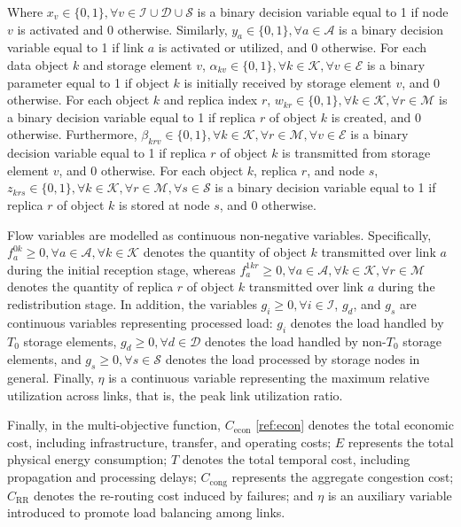 \documentclass[a4paper,fleqn]{cas-dc}
\newcommand{\A}{\mathcal{A}}
\newcommand{\Iset}{\mathcal{I}}
\newcommand{\Dset}{\mathcal{D}}
\newcommand{\Eset}{\mathcal{E}}
\newcommand{\Sset}{\mathcal{S}}
\newcommand{\Kset}{\mathcal{K}}
\newcommand{\Mset}{\mathcal{M}}
\begin{document}
Where $x_v \in \{0,1\}, \forall v \in \Iset \cup \Dset \cup \Sset$ is a binary decision variable equal to 1 if node $v$ is activated and 0 otherwise. Similarly, $y_a \in \{0,1\}, \forall a \in \A$ is a binary decision variable equal to 1 if link $a$ is activated or utilized, and 0 otherwise. For each data object $k$ and storage element $v$, $\alpha_{kv} \in \{0,1\}, \forall k \in \Kset, \forall v \in \Eset$ is a binary parameter equal to 1 if object $k$ is initially received by storage element $v$, and 0 otherwise. For each object $k$ and replica index $r$, $w_{kr} \in \{0,1\}, \forall k \in \Kset, \forall r \in \Mset$ is a binary decision variable equal to 1 if replica $r$ of object $k$ is created, and 0 otherwise. Furthermore, $\beta_{krv} \in \{0,1\}, \forall k \in \Kset, \forall r \in \Mset, \forall v \in \Eset$ is a binary decision variable equal to 1 if replica $r$ of object $k$ is transmitted from storage element $v$, and 0 otherwise. For each object $k$, replica $r$, and node $s$,  $z_{krs} \in \{0,1\}, \forall k \in \Kset, \forall r \in \Mset, \forall s \in \Sset$ is a binary decision variable equal to 1 if replica $r$ of object $k$ is stored at node $s$, and 0 otherwise.

Flow variables are modelled as continuous non-negative variables. Specifically, $f_a^{0k} \ge 0, \forall a \in \A, \forall k \in \Kset$ denotes the quantity of object $k$ transmitted over link $a$ during the initial reception stage, whereas $f_a^{1kr} \ge 0, \forall a \in \A, \forall k \in \Kset, \forall r \in \Mset$ denotes the quantity of replica $r$ of object $k$ transmitted over link $a$ during the redistribution stage. In addition, the variables $g_i \ge 0, \forall i \in \Iset$, $g_d$, and $g_s$ are continuous variables representing processed load: $g_i$ denotes the load handled by $T_0$ storage elements, $g_d \ge 0, \forall d \in \Dset$ denotes the load handled by non-$T_0$ storage elements, and $g_s \ge 0,  \forall s \in \Sset$ denotes the load processed by storage nodes in general. Finally, $\eta$ is a continuous variable representing the maximum relative utilization across links, that is, the peak link utilization ratio.

Finally, in the multi-objective function, \(C_{\mathrm{econ}}\) \ref{ref:econ} denotes the total economic cost, including infrastructure, transfer, and operating costs; \(E\) represents the total physical energy consumption; \(T\) denotes the total temporal cost, including propagation and processing delays; \(C_{\mathrm{cong}}\) represents the aggregate congestion cost; \(C_{\mathrm{RR}}\) denotes the re-routing cost induced by failures; and \(\eta\) is an auxiliary variable introduced to promote load balancing among links.
\end{document}
